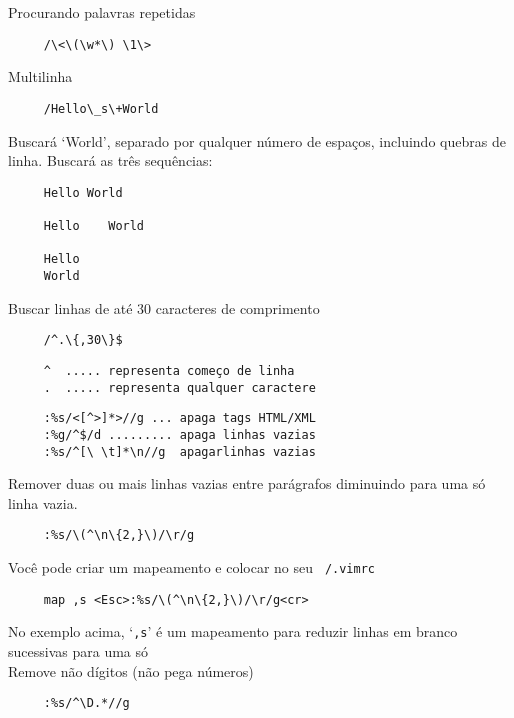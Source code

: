 Procurando palavras repetidas

\begin{verbatim}
     /\<\(\w*\) \1\>
\end{verbatim}

Multilinha

\begin{verbatim}
     /Hello\_s\+World
\end{verbatim}

Buscará `World', separado por qualquer número de espaços,
incluindo quebras de linha. Buscará as três sequências:

\begin{verbatim}
     Hello World

     Hello    World

     Hello
     World
\end{verbatim}

Buscar linhas de até 30 caracteres de comprimento

\begin{verbatim}
     /^.\{,30\}$
\end{verbatim}

\begin{verbatim}
     ^  ..... representa começo de linha
     .  ..... representa qualquer caractere
\end{verbatim}


\begin{verbatim}
     :%s/<[^>]*>//g ... apaga tags HTML/XML
     :%g/^$/d ......... apaga linhas vazias
     :%s/^[\ \t]*\n//g  apagarlinhas vazias
\end{verbatim}


Remover duas ou mais linhas vazias entre parágrafos diminuindo para
uma só linha vazia.

\begin{verbatim}
     :%s/\(^\n\{2,}\)/\r/g
\end{verbatim}

Você pode criar um mapeamento e colocar no seu {\tt ~/.vimrc}

\begin{verbatim}
     map ,s <Esc>:%s/\(^\n\{2,}\)/\r/g<cr>
\end{verbatim}

No exemplo acima, `{\tt ,s}' é um mapeamento para reduzir linhas em branco
sucessivas para uma só  \\


Remove não dígitos (não pega números)

\begin{verbatim}
     :%s/^\D.*//g
\end{verbatim}


